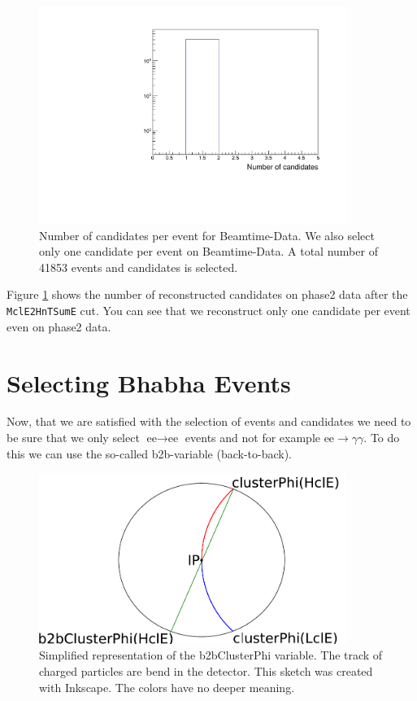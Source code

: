 \documentclass[a4paper,11pt,twosided,final,german,openbib,pdftex,listof=totoc,bibliography=totoc]{scrbook}
\begin{document}
\begin{figure}[h!]
	\centering
	\includegraphics[width=10cm]{Cuts/Data/nCandData.pdf}
	\caption[Number Of Candidates Per Event for Beamtime-Data (All Cuts)]{Number of candidates per event for Beamtime-Data. We also select only one candidate per event on Beamtime-Data. A total number of 41853 events and candidates is selected.}
	\label{fig:nCandData}
\end{figure}

Figure \ref{fig:nCandData} shows the number of reconstructed candidates on phase2 data after the \texttt{MclE2HnTSumE} cut. You can see that we reconstruct only one candidate per event even on phase2 data.



\section{Selecting Bhabha Events}
\label{sec:SelectingElectronPositron}

Now, that we are satisfied with the selection of events and candidates we need to be sure that we only select $\textrm{ee} \rightarrow \textrm{ee}$ events and not for example $\textrm{ee} \rightarrow \gamma \gamma$. To do this we can use the so-called b2b-variable (back-to-back).

\begin{figure}[h!]
	\centering
	\includegraphics[width=10cm]{Bilder/b2b_2}
	\caption[Sketch Of The b2bClusterPhi Variable]{Simplified representation of the b2bClusterPhi variable. The track of charged particles are bend in the detector. This sketch was created with Inkscape. The colors have no deeper meaning.}
	\label{fig:Sketchb2b}
\end{figure}
\end{document}
